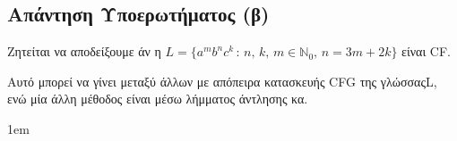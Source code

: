 \subsection{Απάντηση Υποερωτήματος (β)}
\label{ssec:Solution_3.2}
\doublespacing

Ζητείται να αποδείξουμε άν η $L = \{a^mb^nc^k\,:\,n,\,k,\,m\in\mathbb{N}_0,\, n=3m+2k\}$ είναι CF.
\reducevspace\reducevspace\reducevspace\reducevspace\reducevspace\reducevspace
\par
Αυτό μπορεί να γίνει μεταξύ άλλων με απόπειρα κατασκευής CFG της γλώσσαςL, ενώ μία άλλη μέθοδος είναι μέσω λήμματος άντλησης
κα.

\begin{tcolorbox}[colback=yellow!15!white, colframe=blue!50!white,
	fonttitle=\bfseries\Large, title = Απόδειξη με απόπειρα κατασκευής CFG]
	\begin{itemize}
		\itemsep1em


\end{itemize}
\end{tcolorbox}
